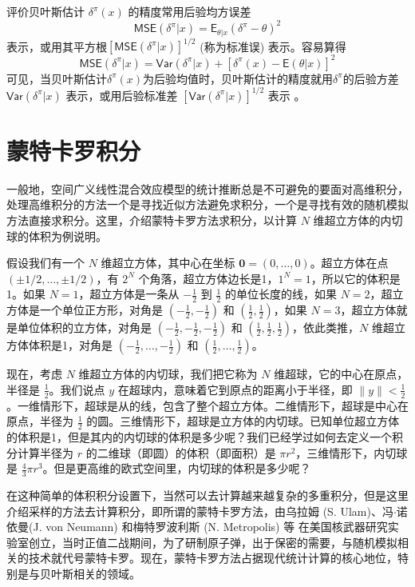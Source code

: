\documentclass[12pt,a4paper,UTF8,twoside]{book}
\theoremstyle{definition}
\theoremstyle{definition}
\theoremstyle{definition}
\theoremstyle{remark}
\begin{document}
评价贝叶斯估计 \(\delta^{\pi}(x)\) 的精度常用后验均方误差
\[\mathsf{MSE}(\delta^{\pi}|x) = \mathsf{E}_{\theta|x}(\delta^{\pi} - \theta)^2\]
表示，或用其平方根\([\mathsf{MSE}(\delta^{\pi}|x)]^{1/2}\) (称为标准误)
表示。容易算得
\[\mathsf{MSE}(\delta^{\pi}|x) = \mathsf{Var}(\delta^{\pi}|x) + [\delta^{\pi}(x) - \mathsf{E}(\theta|x)]^2\]
可见，当贝叶斯估计\(\delta^{\pi}(x)\)为后验均值时，贝叶斯估计的精度就用\(\delta^{\pi}\)的后验方差\(\mathsf{Var}(\delta^{\pi}|x)\)
表示，或用后验标准差 \([\mathsf{Var}(\delta^{\pi}|x)]^{1/2}\) 表示
\citep{mao2006}。

\hypertarget{Curse-of-Dimensionality}{%
\section{蒙特卡罗积分}\label{Curse-of-Dimensionality}}

一般地，空间广义线性混合效应模型的统计推断总是不可避免的要面对高维积分，处理高维积分的方法一个是寻找近似方法避免求积分，一个是寻找有效的随机模拟方法直接求积分。这里，介绍蒙特卡罗方法求积分，以计算
\(N\) 维超立方体的内切球的体积为例说明。

假设我们有一个 \(N\) 维超立方体，其中心在坐标
\(\mathbf{0} = (0,\ldots,0)\)。超立方体在点
\((\pm 1/2,\ldots,\pm 1/2)\)，有 \(2^{N}\)
个角落，超立方体边长是1，\(1^{N}=1\)，所以它的体积是1。如果
\(N=1\)，超立方体是一条从 \(-\frac{1}{2}\) 到 \(\frac{1}{2}\)
的单位长度的线，如果 \(N=2\)，超立方体是一个单位正方形，对角是
\(\left( -\frac{1}{2}, -\frac{1}{2} \right)\) 和
\(\left( \frac{1}{2}, \frac{1}{2} \right)\)，如果
\(N=3\)，超立方体就是单位体积的立方体，对角是
\(\left( -\frac{1}{2}, -\frac{1}{2}, -\frac{1}{2} \right)\) 和
\(\left( \frac{1}{2}, \frac{1}{2}, \frac{1}{2} \right)\)，依此类推，\(N\)
维超立方体体积是1，对角是
\(\left( -\frac{1}{2}, \ldots, -\frac{1}{2} \right)\) 和
\(\left( \frac{1}{2}, \ldots, \frac{1}{2} \right)\)。

现在，考虑 \(N\) 维超立方体的内切球，我们把它称为 \(N\)
维超球，它的中心在原点，半径是 \(\frac{1}{2}\)。我们说点 \(y\)
在超球内，意味着它到原点的距离小于半径，即
\(\| y \| < \frac{1}{2}\)。一维情形下，超球是从的线，包含了整个超立方体。二维情形下，超球是中心在原点，半径为
\(\frac{1}{2}\)
的圆。三维情形下，超球是立方体的内切球。已知单位超立方体的体积是1，但是其内的内切球的体积是多少呢？我们已经学过如何去定义一个积分计算半径为
\(r\) 的二维球（即圆）的体积（即面积）是
\(\pi r^2\)，三维情形下，内切球是
\(\frac{4}{3}\pi r^3\)。但是更高维的欧式空间里，内切球的体积是多少呢？

在这种简单的体积积分设置下，当然可以去计算越来越复杂的多重积分，但是这里介绍采样的方法去计算积分，即所谓的蒙特卡罗方法，由乌拉姆
(S. Ulam)、冯\(\cdot\)诺依曼(J. von Neumann) 和梅特罗波利斯 (N.
Metropolis) 等
在美国核武器研究实验室创立，当时正值二战期间，为了研制原子弹，出于保密的需要，与随机模拟相关的技术就代号蒙特卡罗。现在，蒙特卡罗方法占据现代统计计算的核心地位，特别是与贝叶斯相关的领域。
\end{document}

